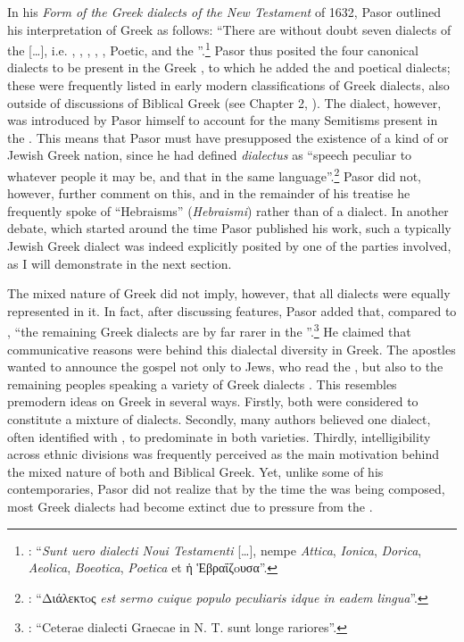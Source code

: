 In his \textit{Form of the Greek dialects of the New Testament} of 1632, Pasor outlined his interpretation of  Greek as follows: “There are without doubt seven dialects of the  […], i.e. , , , , , Poetic, and the ”.\footnote{\citet[1--2]{Pasor1632}: “\textit{Sunt uero dialecti Noui Testamenti} […], nempe \textit{Attica}, \textit{Ionica}, \textit{Dorica}, \textit{Aeolica}, \textit{Boeotica}, \textit{Poetica} et ἡ Ἑβραΐζoυσα”.} Pasor thus posited the four canonical dialects to be present in the Greek , to which he added the  and poetical dialects; these were frequently listed in early modern classifications of Greek dialects, also outside of discussions of Biblical Greek (see Chapter 2, ). The  dialect, however, was introduced by Pasor himself to account for the many Semitisms present in the . This means that Pasor must have presupposed the existence of a kind of  or Jewish Greek nation, since he had defined \textit{dialectus} as “speech peculiar to whatever people it may be, and that in the same language”.\footnote{\citet[1]{Pasor1632}: “Διάλεκτoς \textit{est sermo cuique populo peculiaris idque in eadem lingua}”.} Pasor did not, however, further comment on this, and in the remainder of his treatise he frequently spoke of “Hebraisms” (\textit{Hebraismi}) rather than of a  dialect. In another debate, which started around the time Pasor published his work, such a typically Jewish Greek dialect was indeed explicitly posited by one of the parties involved, as I will demonstrate in the next section.

The mixed nature of  Greek did not imply, however, that all dialects were equally represented in it. In fact, after discussing  features, Pasor added that, compared to , “the remaining Greek dialects are by far rarer in the ”.\footnote{\citet[24]{Pasor1632}: “Ceterae dialecti Graecae in N. T. sunt longe rariores”.} He claimed that communicative reasons were behind this dialectal diversity in  Greek. The apostles wanted to announce the gospel not only to Jews, who read the , but also to the remaining peoples speaking a variety of Greek dialects \citep[143]{Pasor1650}. This resembles premodern ideas on  Greek in several ways. Firstly, both were considered to constitute a mixture of dialects. Secondly, many authors believed one dialect, often identified with , to predominate in both varieties. Thirdly, intelligibility across ethnic divisions was frequently perceived as the main motivation behind the mixed nature of both  and Biblical Greek. Yet, unlike some of his contemporaries, Pasor did not realize that by the time the  was being composed, most Greek dialects had become extinct due to pressure from the .

